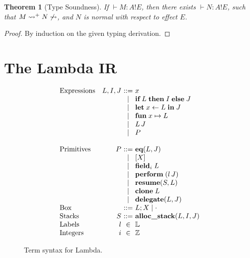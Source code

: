 \documentclass[12pt,mscres,cdtppar,twoside,openright,logo,rightchapter,normalheadings]{infthesis}
\makeatletter
\newtheorem{theorem}{Theorem}[section]
\theoremstyle{definition}
\newcommand{\slab}[1]{\textrm{#1}}
\newcommand{\revto}{\ensuremath{\leftarrow}}
\newcommand{\keyw}[1]{\textbf{#1}}
\newcommand{\Let}{\keyw{let}}
\newcommand{\In}{\keyw{in}}
\newcommand{\eff}{!}
\newcommand{\typc}[3]{#1 \vdash #2 \eff #3}
\newcommand{\reducesto}[0]{\ensuremath{\leadsto}}
\newcommand{\ba}{\begin{array}}
\newcommand{\ea}{\end{array}}
\newenvironment{syntax}{\[\ba{@{}l@{\quad}r@{~}c@{~}l@{}}}{\ea\]\ignorespacesafterend}
\makeatother
\begin{document}
\begin{theorem}[Type Soundness]
If $\typc{}{M : A}{E}$, then there exists $\typc{}{N : A}{E}$, such that
$M \reducesto^+ N \not\reducesto$, and $N$ is normal with respect to
effect $E$.
\end{theorem}
\begin{proof}
By induction on the given typing derivation.
\end{proof}

\section{The Lambda IR}
\label{sec:lambda}

\newcommand{\If}{\keyw{if}}
\newcommand{\Then}{\keyw{then}}
\newcommand{\Else}{\keyw{else}}
\newcommand{\Fun}{\keyw{fun}}
\newcommand{\Perform}{\keyw{perform}}
\newcommand{\Resume}{\keyw{resume}}
\newcommand{\Clone}{\keyw{clone}}
\newcommand{\Makeblock}{\keyw{makeblock}}
\newcommand{\Field}{\keyw{field}}
\newcommand{\Eq}{\keyw{eq}}
\newcommand{\Alloc}{\keyw{alloc\_stack}}
\newcommand{\Error}{\keyw{error}}
\newcommand{\Delegate}{\keyw{delegate}}

\begin{figure}
\begin{syntax}
\slab{Expressions}   &L,I,J  &::= & x\\
                     &     &\mid& \If \; L \; \Then \; I \; \Else \; J\\
                     &     &\mid& \Let \; x \revto L \; \In \; J\\
                     &     &\mid& \Fun \; x \mapsto L \\
                     &     &\mid& L\,J\\
                     &     &\mid& P\\
                     &     &    &\\
\slab{Primitives}    &P    &::= & \Eq(L,J)\\
                     &     &\mid& [X]\\
                     &     &\mid& \Field_i\; L\\
                     &     &\mid& \Perform \; (l\,J) \\
                     &     &\mid& \Resume(S,L) \\
                     &     &\mid& \Clone \; L\\
                     &     &\mid& \Delegate(L,J)\\
\slab{Box}           &     &::= & L;X \mid \cdot\\
\slab{Stacks}        &S    &::= & \Alloc (L,I,J)\\
\slab{Labels}        &l    &\in & \mathbb{L}\\
\slab{Integers}      &i    &\in & \mathbb{Z} 
\end{syntax}
\caption{Term syntax for Lambda.}\label{fig:lambda-terms}
\end{figure}
\end{document}
